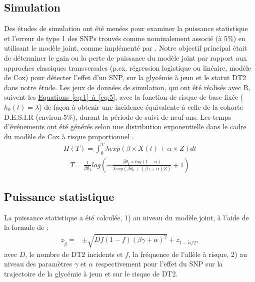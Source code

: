 \documentclass[11pt, a4paper]{article}
\begin{document}
\subsection{Simulation}
\par{Des études de simulation ont été menées pour examiner la puissance statistique et l'erreur de type 1 des SNPs trouvés comme nominalement associé (à 5\%) en utilisant le modèle joint, comme implémenté par \citet{rizopoulos_jm_2010}.
Notre objectif principal était de déterminer le gain ou la perte de puissance du modèle joint par rapport aux approches classiques transversales (p.ex. régression logistique ou linéaire, modèle de Cox)
pour détecter l'effet d'un SNP, sur la glycémie à jeun et le statut DT2 dans notre étude.
Les jeux de données de simulation, qui ont été réalisés avec R, suivent les \hyperref[eq:1]{Equations~\ref*{eq:1}~à~\ref{eq:5}},
avec la fonction de risque de base fixée ($h_0(t)=\lambda$) de façon à obtenir une incidence équivalente à celle de la cohorte D.E.S.I.R (environ 5\%), durant la période de suivi de neuf ans.
Les temps d'événements ont été générés selon une distribution exponentielle dans le cadre du modèle de Cox à risque proportionnel \citep{austin_generating_2012}.
\begin{eqnarray}H(T)=\int_0^T \lambda exp(\beta \times X(t) + \alpha \times Z) dt\end{eqnarray}
\begin{eqnarray}T=\frac{1}{\beta\theta_1} log\left( - \frac{\beta\theta_1 \times log(1-u)}{\lambda exp(\beta\theta_0+(\beta\gamma+\alpha)Z)}+1 \right)\end{eqnarray}
}

\subsection{Puissance statistique}
\par{La puissance statistique a été calculée, 1) au niveau du modèle joint, à l'aide de la formule de \citet{chen_sample_2011}:
\begin{eqnarray}z_{\tilde{\beta}}=&\pm\sqrt{Df(1-f)(\beta\gamma+\alpha)^2}+z_{1-\tilde{\alpha}/2},\end{eqnarray}
avec $D$, le nombre de DT2 incidents et $f$, la fréquence de l'allèle à risque,
2) au niveau des paramètres $\gamma$ et $\alpha$ respectivement pour l'effet du SNP sur la trajectoire de la glycémie à jeun et sur le risque de DT2.}


\clearpage
\end{document}
